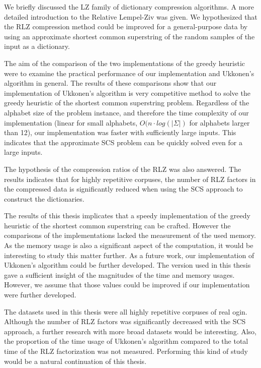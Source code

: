 \documentclass[english,twoside,censored,csm,algorithms-track-2020]{HYthesisML}
\theoremstyle{plain}
\theoremstyle{definition}
\begin{document}
We briefly discussed the LZ family of dictionary compression algorithms.
A more detailed introduction to the Relative Lempel-Ziv was given.
We hypothesized that the RLZ compression method could be improved for a
general-purpose data by using an approximate shortest common
superstring of the random samples of the input as a dictionary. 

The aim of the comparison of the two implementations of the
greedy heuristic were to examine the practical performance
of our implementation and Ukkonen's algorithm in general.
The results of these comparisons show that our implementation
of Ukkonen's algorithm is very competitive method to solve
the greedy heuristic of the shortest common superstring
problem. Regardless of the alphabet size of the problem instance,
and therefore the time complexity of our implementation
(linear for small alphabets, $O(n\cdot log(|\Sigma|)$ for
alphabets larger than 12), our implementation was faster with
sufficiently large inputs. This indicates that the approximate
SCS problem can be quickly solved even for a large inputs.

The hypothesis of the compression ratios of the RLZ was also
answered. The results indicates that for highly repetitive
corpuses, the number of RLZ factors in the compressed data
is significantly reduced when using the SCS approach to
construct the dictionaries.

The results of this thesis implicates that a speedy implementation of the greedy heuristic of
the shortest common superstring can be crafted.
However the comparisons of the implementations lacked the
measurement of the used memory. As the memory usage is also
a significant aspect of the computation, it would be
interesting to study this matter further. As a future
work, our implementation of Ukkonen's algorithm could
be further developed. The version used in this thesis
gave a sufficient insight of the magnitudes of the
time and memory usages. However, we assume that those
values could be improved if our implementation were
further developed.

The datasets used in this thesis were all highly repetitive
corpuses of real ogin. Although the number of RLZ factors was
significantly decreased with the SCS approach, a further research
with more broad datasets would be interesting. Also, the proportion
of the time usage of Ukkonen's algorithm compared to the total time
of the RLZ factorization was not measured. Performing this kind of
study would be a natural continuation of this thesis.
\end{document}
